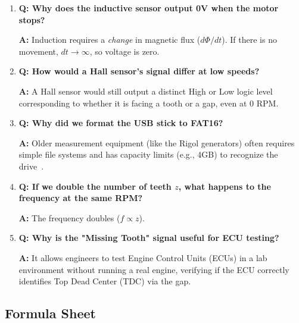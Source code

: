 \documentclass[a4paper,12pt]{article}
\begin{document}
\begin{enumerate}

    \item \textbf{Q: Why does the inductive sensor output 0V when the motor stops?}

    \textbf{A:} Induction requires a \textit{change} in magnetic flux ($d\Phi/dt$). If there is no movement, $dt \to \infty$, so voltage is zero.



    \item \textbf{Q: How would a Hall sensor's signal differ at low speeds?}

    \textbf{A:} A Hall sensor would still output a distinct High or Low logic level corresponding to whether it is facing a tooth or a gap, even at 0 RPM.



    \item \textbf{Q: Why did we format the USB stick to FAT16?}

    \textbf{A:} Older measurement equipment (like the Rigol generators) often requires simple file systems and has capacity limits (e.g., 4GB) to recognize the drive~\cite{ref187}.



    \item \textbf{Q: If we double the number of teeth $z$, what happens to the frequency at the same RPM?}

    \textbf{A:} The frequency doubles ($f \propto z$).



    \item \textbf{Q: Why is the "Missing Tooth" signal useful for ECU testing?}

    \textbf{A:} It allows engineers to test Engine Control Units (ECUs) in a lab environment without running a real engine, verifying if the ECU correctly identifies Top Dead Center (TDC) via the gap.

\end{enumerate}



\subsection{Formula Sheet}
\end{document}
